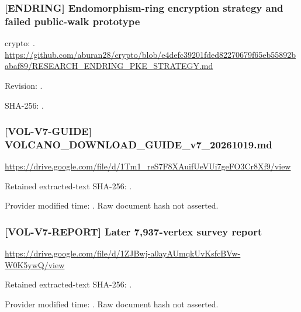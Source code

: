 \par\noindent\begin{minipage}{\linewidth}\small
\subsubsection*{[ENDRING] Endomorphism-ring encryption strategy and failed public-walk prototype}\label{art:ENDRING}
crypto: .
\url{https://github.com/aburan28/crypto/blob/e4defc39201fded82270679f65eb55892babaf89/RESEARCH_ENDRING_PKE_STRATEGY.md}
\par Revision: .
\par SHA-256: .
\end{minipage}\par\medskip

\par\noindent\begin{minipage}{\linewidth}\small
\subsubsection*{[VOL-V7-GUIDE] VOLCANO\_DOWNLOAD\_GUIDE\_v7\_20261019.md}\label{art:VOL-V7-GUIDE}
\url{https://drive.google.com/file/d/1Tm1_reS7F8XAuifUeVUi7geFO3Cr8Xf9/view}
\par Retained extracted-text SHA-256: .
\par Provider modified time: . Raw document hash not asserted.
\end{minipage}\par\medskip

\par\noindent\begin{minipage}{\linewidth}\small
\subsubsection*{[VOL-V7-REPORT] Later 7,937-vertex survey report}\label{art:VOL-V7-REPORT}
\url{https://drive.google.com/file/d/1ZJBwj-a0ayAUmqkUvKsfcBVw-W0K5ywQ/view}
\par Retained extracted-text SHA-256: .
\par Provider modified time: . Raw document hash not asserted.
\end{minipage}\par\medskip

